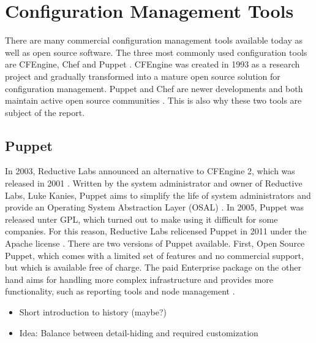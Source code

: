 \section{Configuration Management Tools}



There are many commercial configuration management tools available today as well as open source software. The three most commonly used configuration tools are CFEngine, Chef and Puppet \cite{pandey2012investigating}. CFEngine was created in 1993 as a research project and gradually transformed into a mature open source solution for configuration management\cite{Zamboni:2012:LCA:2341102}. Puppet and Chef are newer developments and both maintain active open source communities \cite{pandey2012investigating}. This is also why these two tools are subject of the report.


\subsection{Puppet}

In 2003, Reductive Labs announced an alternative to CFEngine 2, which was released in 2001 \cite{pandey2012investigating}. Written by the system administrator and owner of Reductive Labs, Luke Kanies, Puppet aims to simplify the life of system administrators and provide an Operating System Abstraction Layer (OSAL) \cite{kanies2006puppet}. In 2005, Puppet was released unter GPL, which turned out to make using it difficult for some companies. For this reason, Reductive Labs relicensed Puppet in 2011 under the Apache license \cite{puppetcomapache}. There are two versions of Puppet available. First, Open Source Puppet, which comes with a limited set of features and no commercial support, but which is available free of charge. The paid Enterprise package on the other hand aims for handling more complex infrastructure and provides more functionality, such as reporting tools and node management \cite{puppetcomenterprise}.


\begin{itemize}
	\item Short introduction to history (maybe?)
	\item Idea: Balance between detail-hiding and required customization
\end{itemize}

